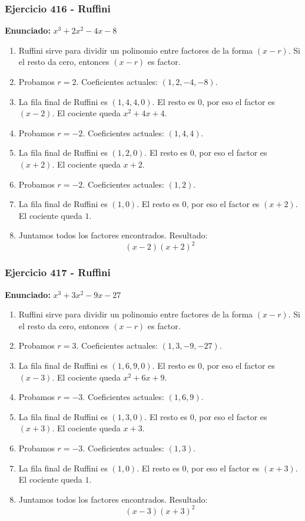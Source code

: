 \documentclass[11pt,a4paper]{article}
\begin{document}
\vspace{0.2cm}
\subsubsection*{Ejercicio 416 - Ruffini}
\textbf{Enunciado:} $ x^{3} + 2 x^{2} - 4 x - 8 $\par
\begin{enumerate}[leftmargin=2em]
\item Ruffini sirve para dividir un polinomio entre factores de la forma \((x-r)\). Si el resto da cero, entonces \((x-r)\) es factor.
\item Probamos \(r=2\). Coeficientes actuales: \((1, 2, -4, -8)\).
\item La fila final de Ruffini es \((1, 4, 4, 0)\). El resto es \(0\), por eso el factor es \((x-2)\). El cociente queda \(x^{2} + 4 x + 4\).
\item Probamos \(r=-2\). Coeficientes actuales: \((1, 4, 4)\).
\item La fila final de Ruffini es \((1, 2, 0)\). El resto es \(0\), por eso el factor es \((x+2)\). El cociente queda \(x + 2\).
\item Probamos \(r=-2\). Coeficientes actuales: \((1, 2)\).
\item La fila final de Ruffini es \((1, 0)\). El resto es \(0\), por eso el factor es \((x+2)\). El cociente queda \(1\).
\item Juntamos todos los factores encontrados. Resultado: \[\boxed{\left(x - 2\right) \left(x + 2\right)^{2}}\]
\end{enumerate}

\vspace{0.2cm}
\subsubsection*{Ejercicio 417 - Ruffini}
\textbf{Enunciado:} $ x^{3} + 3 x^{2} - 9 x - 27 $\par
\begin{enumerate}[leftmargin=2em]
\item Ruffini sirve para dividir un polinomio entre factores de la forma \((x-r)\). Si el resto da cero, entonces \((x-r)\) es factor.
\item Probamos \(r=3\). Coeficientes actuales: \((1, 3, -9, -27)\).
\item La fila final de Ruffini es \((1, 6, 9, 0)\). El resto es \(0\), por eso el factor es \((x-3)\). El cociente queda \(x^{2} + 6 x + 9\).
\item Probamos \(r=-3\). Coeficientes actuales: \((1, 6, 9)\).
\item La fila final de Ruffini es \((1, 3, 0)\). El resto es \(0\), por eso el factor es \((x+3)\). El cociente queda \(x + 3\).
\item Probamos \(r=-3\). Coeficientes actuales: \((1, 3)\).
\item La fila final de Ruffini es \((1, 0)\). El resto es \(0\), por eso el factor es \((x+3)\). El cociente queda \(1\).
\item Juntamos todos los factores encontrados. Resultado: \[\boxed{\left(x - 3\right) \left(x + 3\right)^{2}}\]
\end{enumerate}
\end{document}

